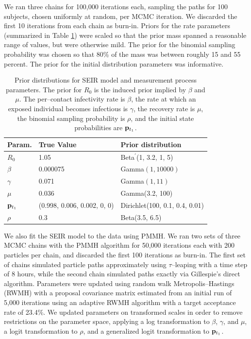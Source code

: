 We ran three chains for 100,000 iterations each, sampling the paths for 100 subjects, chosen uniformly at random, per MCMC iteration. We discarded the first 10 iterations from each chain as burn-in. Priors for the rate parameters (summarized in Table \ref{tab:sim1_seir_priors}) were scaled so that the prior mass spanned a reasonable range of values, but were otherwise mild. The prior for the binomial sampling probability was chosen so that 80\% of the mass was between roughly 15 and 55 percent. The prior for the initial distribution parameters was informative.

\begin{table}[htbp]
	\centering
	\begin{tabular}{lll}
		\hline
		Param. & True Value & Prior distribution \\ 
		\hline
		$ R_0 $ & 1.05 & Beta$ ^\prime $(1, 3.2, 1, 5) \\
		$ \beta $ & 0.000075 & Gamma$ (1, 10000) $ \\
		$ \gamma $ & 0.071 & Gamma$ (1, 11) $\\ 
		$ \mu $ & 0.036 & Gamma(3.2, 100)  \\ 
		$ \mathbf{p}_{t_1} $ & (0.998, 0.006, 0.002, 0, 0) & Dirichlet(100, 0.1, 0.4, 0.01)  \\ 
		$ \rho $ & 0.3 & Beta(3.5, 6.5) \\
		\hline
	\end{tabular}
	\caption{Prior distributions for SEIR model and measurement process parameters. The prior for $ R_0 $ is the induced prior implied by $ \beta $ and $ \mu $. The per--contact infectivity rate is $ \beta $, the rate at which an exposed individual becomes infectious is $ \gamma $, the recovery rate is $ \mu $, the binomial sampling probability is $ \rho $, and the initial state probabilities are $ \mathbf{p}_{t_1} $.}
	\label{tab:sim1_seir_priors}
\end{table}

We also fit the SEIR model to the data using PMMH. We ran two sets of three MCMC chains with the PMMH algorithm for 50,000 iterations each with 200 particles per chain, and discarded the first 100 iterations as burn-in. The first set of chains simulated particle paths approximately using $ \tau $--leaping with a time step of 8 hours, while the second chain simulated paths exactly via Gillespie's direct algorithm. Parameters were updated using random walk Metropolis--Hastings (RWMH) with a proposal covariance matrix estimated from an initial run of 5,000 iterations using an adaptive RWMH algorithm with a target acceptance rate of 23.4\%. We updated parameters on transformed scales in order to remove restrictions on the parameter space, applying a log transformation to $ \beta $, $ \gamma $, and $ \mu $, a logit transformation to $ \rho $, and a generalized logit transformation to $ \mathbf{p}_{t_1} $.

